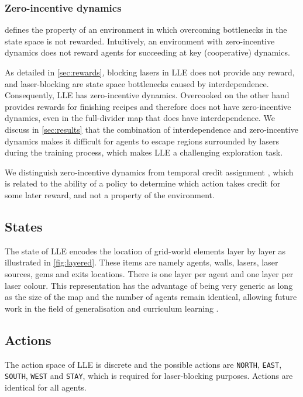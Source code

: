 \subsubsection{Zero-incentive dynamics} defines the property of an environment in which overcoming bottlenecks in the state space is not rewarded. Intuitively, an environment with zero-incentive dynamics does not reward agents for succeeding at key (cooperative) dynamics. 

As detailed in \autoref{sec:rewards}, blocking lasers in LLE does not provide any reward, and laser-blocking are state space bottlenecks caused by interdependence. Consequently, LLE has zero-incentive dynamics. Overcooked on the other hand provides rewards for finishing recipes and therefore does not have zero-incentive dynamics, even in the full-divider map that does have interdependence. We discuss in \autoref{sec:results} that the combination of interdependence and zero-incentive dynamics makes it difficult for agents to escape regions surrounded by lasers during the training process, which makes LLE a challenging exploration task.

We distinguish zero-incentive dynamics from temporal credit assignment \citep{sutton_1984_credit_assignment}, which is related to the ability of a policy to determine which action takes credit for some later reward, and not a property of the environment.


\subsection{States}
The state of LLE encodes the location of grid-world elements layer by layer as illustrated in \autoref{fig:layered}. These items are namely agents, walls, lasers, laser sources, gems and exits locations. There is one layer per agent and one layer per laser colour. 
This representation has the advantage of being very generic as long as the size of the map and the number of agents remain identical, allowing future work in the field of generalisation and curriculum learning \citep{parker2022evolving}.

\subsection{Actions}
The action space of LLE is discrete and the possible actions are \texttt{NORTH}, \texttt{EAST}, \texttt{SOUTH}, \texttt{WEST} and \texttt{STAY}, which is required for laser-blocking purposes. Actions are identical for all agents.


